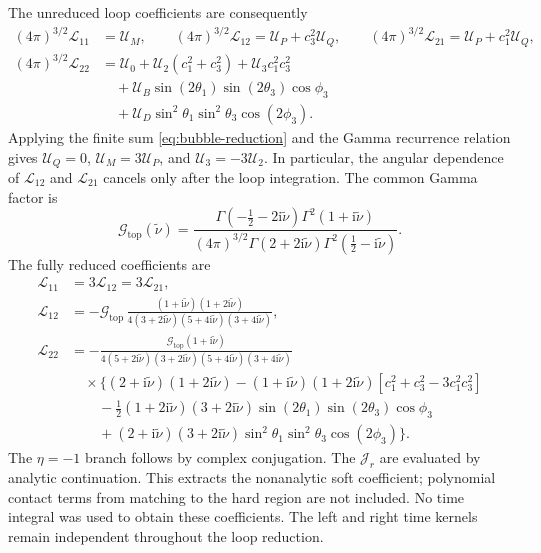 \documentclass[a4paper,12pt]{article}
\newcommand{\ii}{\mathrm i}
\newcommand{\tn}{\tilde\nu}
\begin{document}
The unreduced loop coefficients are consequently
\begin{align}
 (4\pi)^{3/2}\mathscr L_{11}&=\mathcal U_M,\qquad
 (4\pi)^{3/2}\mathscr L_{12}=\mathcal U_P+c_3^2\mathcal U_Q,\qquad
 (4\pi)^{3/2}\mathscr L_{21}=\mathcal U_P+c_1^2\mathcal U_Q,
 \nonumber\\
 (4\pi)^{3/2}\mathscr L_{22}
 &=\mathcal U_0+\mathcal U_2(c_1^2+c_3^2)+\mathcal U_3c_1^2c_3^2
 \nonumber\\
 &\quad+\mathcal U_B\sin(2\theta_1)\sin(2\theta_3)\cos\phi_3
 \nonumber\\
 &\quad+\mathcal U_D\sin^2\theta_1\sin^2\theta_3\cos(2\phi_3).
 \label{eq:top-loop-reduction}
\end{align}
Applying the finite sum \eqref{eq:bubble-reduction} and the Gamma
recurrence relation gives
$\mathcal U_Q=0$, $\mathcal U_M=3\mathcal U_P$, and
$\mathcal U_3=-3\mathcal U_2$.
In particular, the angular dependence of
$\mathscr L_{12}$ and $\mathscr L_{21}$
cancels only after the loop integration.
The common Gamma factor is
\begin{equation}
 \mathcal G_{\mathrm{top}}(\tn)
 =\frac{\Gamma(-\tfrac12-2\ii\tn)\Gamma^2(1+\ii\tn)}
 {(4\pi)^{3/2}\Gamma(2+2\ii\tn)
 \Gamma^2(\tfrac12-\ii\tn)}.
 \label{eq:top-loop-Gamma}
\end{equation}
The fully reduced coefficients are
\begin{align}
 \mathscr L_{11}
 &=3\mathscr L_{12}=3\mathscr L_{21},
 \nonumber\\
 \mathscr L_{12}
 &=-\mathcal G_{\mathrm{top}}\,
 \frac{(1+\ii\tn)(1+2\ii\tn)}
 {4(3+2\ii\tn)(5+4\ii\tn)(3+4\ii\tn)},
 \nonumber\\
 \mathscr L_{22}
 &=-\frac{\mathcal G_{\mathrm{top}}(1+\ii\tn)}
 {4(5+2\ii\tn)(3+2\ii\tn)(5+4\ii\tn)(3+4\ii\tn)}
 \nonumber\\
 &\quad\times\Big\{(2+\ii\tn)(1+2\ii\tn)
 -(1+\ii\tn)(1+2\ii\tn)
 [c_1^2+c_3^2-3c_1^2c_3^2]\nonumber\\
 &\qquad-\frac12(1+2\ii\tn)(3+2\ii\tn)
 \sin(2\theta_1)\sin(2\theta_3)\cos\phi_3\nonumber\\
 &\qquad+(2+\ii\tn)(3+2\ii\tn)
 \sin^2\theta_1\sin^2\theta_3\cos(2\phi_3)\Big\}.
 \label{eq:loop-first-coefficients}
\end{align}
The $\eta=-1$ branch follows by complex conjugation.
The $\mathcal J_r$ are evaluated
by analytic continuation. This extracts the nonanalytic soft
coefficient; polynomial contact terms from matching to the hard
region are not included.
No time integral was used to obtain these coefficients. The left and
right time kernels remain independent throughout the loop reduction.
\end{document}
